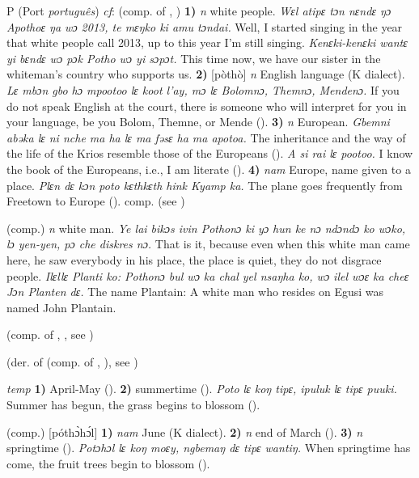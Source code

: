 \begin{letter}{P}
 (Port \textit{português}) \textit{cf}:  (comp. of , ) \textbf{1)} \textit{n} white people. \textit{Wɛl atipɛ tɔn nɛndɛ ŋɔ Apothoɛ ŋa wɔ 2013, te mɛŋko ki amu tɔndai.} Well, I started singing in the year that white people call 2013, up to this year I'm still singing. \textit{Kenɛki-kenɛki wantɛ yi bɛndɛ wɔ pɔk Potho wɔ yi sɔpɔt.} This time now, we have our sister in the whiteman's country who supports us. \textbf{2)} [pòthò] \textit{n} English language (K dialect). \textit{Lɛ mbɔn gbo hɔ mpootoo lɛ koot l'ay, mɔ lɛ Bolomnɔ, Themnɔ, Mendenɔ.} If you do not speak English at the court, there is someone who will interpret for you in your language, be you Bolom, Themne, or Mende (\citealt{Pichl1967}). \textbf{3)} \textit{n} European. \textit{Gbemni abəka lɛ ni nche ma ha lɛ ma fəsɛ ha ma apotoa.} The inheritance and the way of the life of the Krios resemble those of the Europeans (\citealt{Pichl1967}). \textit{A si rai lɛ pootoo.} I know the book of the Europeans, i.e., I am literate (\citealt{Pichl1967}). \textbf{4)} \textit{nam} Europe, name given to a place. \textit{Plɛn dɛ kɔn poto kɛthkɛth hink Kyamp ka.} The plane goes frequently from Freetown to Europe (\citealt{Pichl1967}). comp.  (see ) 

 (comp.) \textit{n} white man. \textit{Ye lai bikɔs ivin Pothonɔ ki yɔ hun ke nɔ ndɔndɔ ko wɔko, lɔ yen-yen, pɔ che diskres nɔ.} That is it, because even when this white man came here, he saw everybody in his place, the place is quiet, they do not disgrace people. \textit{Ilɛllɛ Planti ko: Pothonɔ bul wɔ ka chal yel nsaŋha ko, wɔ ilel wɔɛ ka cheɛ Jɔn Planten dɛ.} The name Plantain: A white man who resides on Egusi was named John Plantain.

 (comp. of , , see ) 

 (der. of  (comp. of , ), see ) 

 \textit{temp} \textbf{1)} April-May (\citealt{Pichl1967}). \textbf{2)} summertime (\citealt{Pichl1967}). \textit{Poto lɛ koŋ tipɛ, ipuluk lɛ tipɛ puuki.} Summer has begun, the grass begins to blossom (\citealt{Pichl1967}).

 (comp.) [póthɔ̀hɔ́l] \textbf{1)} \textit{nam} June (K dialect). \textbf{2)} \textit{n} end of March (\citealt{Pichl1967}). \textbf{3)} \textit{n} springtime (\citealt{Pichl1967}). \textit{Potɔhɔl lɛ koŋ moɛy, ngbemaŋ dɛ tipɛ wantiŋ.} When springtime has come, the fruit trees begin to blossom (\citealt{Pichl1967}).


\end{letter}
